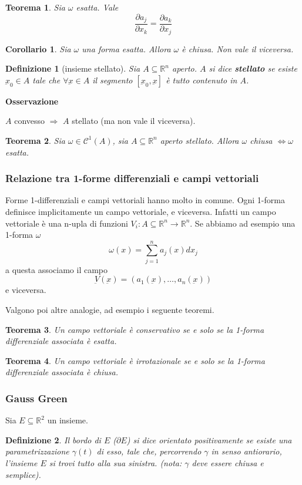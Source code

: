 \documentclass[a4paper,12pt]{article}
\newcommand{\cont}{\mathscr{C}}
\newtheorem{teo}{Teorema}
\newtheorem{defi}{Definizione}
\newtheorem{cor}{Corollario}
\begin{document}
\begin{teo}
 Sia $\omega$ esatta. Vale
 $$\frac{\partial a_j}{\partial x_k} = \frac{\partial a_k}{\partial x_j} $$
\end{teo}

\begin{cor}
 Sia $\omega$ una forma esatta. Allora $\omega$ è chiusa. Non vale il viceversa.
\end{cor}

\begin{defi}[insieme stellato]
 Sia $A\subseteq\mathbb{R}^n$ aperto. $A$ si dice \textbf{stellato} se esiste $\underbar{x}_0\in A$ tale che
 $\forall \underbar{x} \in A$ il segmento $[\underbar{x}_0,\underbar{x}]$ è tutto contenuto in $A$.
\end{defi}
\textbf{Osservazione}

$A$ convesso $\Rightarrow$ $A$ stellato (ma non vale il viceversa).

\begin{teo}
Sia $\omega\in\cont^1(A)$, sia $A\subseteq \mathbb{R}^n$ aperto stellato. Allora $\omega$ chiusa $\Leftrightarrow\omega$ esatta.
\end{teo}

\subsubsection{Relazione tra 1-forme differenziali e campi vettoriali}

Forme 1-differenziali e campi vettoriali hanno molto in comune.
Ogni 1-forma definisce implicitamente un campo vettoriale, e viceversa. Infatti un campo vettoriale è una n-upla di funzioni $V_i:A\subseteq\mathbb{R}^n\rightarrow\mathbb{R}^n$.
Se abbiamo ad esempio una 1-forma $\omega$
$$\omega(x) = \sum_{j=1}^n a_j(x)dx_j$$
a questa associamo il campo
$$\underbar{V}(\underbar{x}) = (a_1(\underbar{x}), \dots, a_n(\underbar{x}))$$
e viceversa.

Valgono poi altre analogie, ad esempio i seguente teoremi.
\begin{teo}
Un campo vettoriale è conservativo se e solo se la 1-forma differenziale associata è esatta.
\end{teo}

\begin{teo}
Un campo vettoriale è irrotazionale se e solo se la 1-forma differenziale associata è chiusa.
\end{teo}

\subsubsection{Gauss Green}
Sia $E\subseteq \mathbb{R}^2$ un insieme.
\begin{defi}
Il bordo di $E$ ($\partial E$) si dice orientato positivamente se esiste una parametrizzazione $\gamma(t)$ di esso, tale che, percorrendo $\gamma$ in senso antiorario, l'insieme $E$ si trovi tutto alla sua sinistra. (nota: $\gamma$ deve essere chiusa e semplice).
\end{defi}
\end{document}
